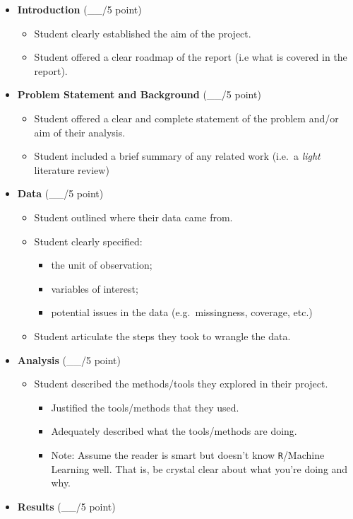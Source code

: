 \documentclass[
  11pt,
]{article}
\providecommand{\tightlist}{%
  \setlength{\itemsep}{0pt}\setlength{\parskip}{0pt}}
\begin{document}
\begin{itemize}
\item
  \textbf{Introduction} (\_\_/5 point)

  \begin{itemize}
  \item
    Student clearly established the aim of the project.
  \item
    Student offered a clear roadmap of the report (i.e what is covered
    in the report).
  \end{itemize}
\item
  \textbf{Problem Statement and Background} (\_\_/5 point)

  \begin{itemize}
  \item
    Student offered a clear and complete statement of the problem and/or
    aim of their analysis.
  \item
    Student included a brief summary of any related work (i.e.~a
    \emph{light} literature review)
  \end{itemize}
\item
  \textbf{Data} (\_\_/5 point)

  \begin{itemize}
  \item
    Student outlined where their data came from.
  \item
    Student clearly specified:

    \begin{itemize}
    \tightlist
    \item
      the unit of observation;
    \item
      variables of interest;
    \item
      potential issues in the data (e.g.~missingness, coverage, etc.)
    \end{itemize}
  \item
    Student articulate the steps they took to wrangle the data.
  \end{itemize}
\item
  \textbf{Analysis} (\_\_/5 point)

  \begin{itemize}
  \tightlist
  \item
    Student described the methods/tools they explored in their project.

    \begin{itemize}
    \tightlist
    \item
      Justified the tools/methods that they used.
    \item
      Adequately described what the tools/methods are doing.
    \item
      Note: Assume the reader is smart but doesn't know
      \texttt{R}/Machine Learning well. That is, be crystal clear about
      what you're doing and why.
    \end{itemize}
  \end{itemize}
\item
  \textbf{Results} (\_\_/5 point)


\end{itemize}
\end{document}
